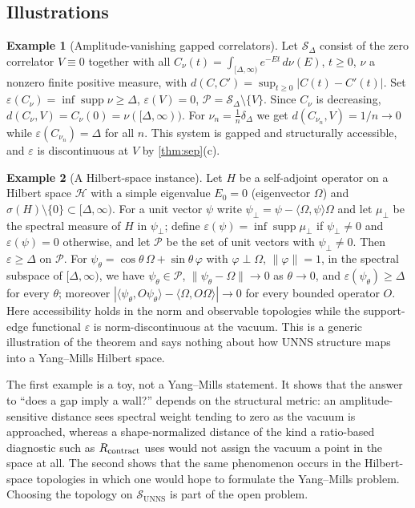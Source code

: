 \documentclass[11pt,a4paper]{article}
\theoremstyle{definition}
\newtheorem{example}{Example}
\theoremstyle{remark}
\newcommand{\SUNNS}{\mathcal{S}_{\mathrm{UNNS}}}
\newcommand{\Pset}{\mathcal{P}}
\newcommand{\uns}{UNNS}
\begin{document}
\subsection{Illustrations}
\begin{example}[Amplitude-vanishing gapped correlators]\label{ex:corr}
Let $\mathcal S_\Delta$ consist of the zero correlator $V\equiv0$ together with all $C_\nu(t)=\int_{[\Delta,\infty)}e^{-Et}\,d\nu(E)$, $t\ge0$, $\nu$ a nonzero finite positive measure, with $d(C,C')=\sup_{t\ge0}|C(t)-C'(t)|$. Set $\varepsilon(C_\nu)=\inf\operatorname{supp}\nu\ge\Delta$, $\varepsilon(V)=0$, $\Pset=\mathcal S_\Delta\setminus\{V\}$. Since $C_\nu$ is decreasing, $d(C_\nu,V)=C_\nu(0)=\nu([\Delta,\infty))$. For $\nu_n=\tfrac1n\delta_\Delta$ we get $d(C_{\nu_n},V)=1/n\to0$ while $\varepsilon(C_{\nu_n})=\Delta$ for all $n$. This system is gapped and structurally accessible, and $\varepsilon$ is discontinuous at $V$ by \cref{thm:sep}(c).
\end{example}
\begin{example}[A Hilbert-space instance]\label{ex:hilbert}
Let $H$ be a self-adjoint operator on a Hilbert space $\mathcal H$ with a simple eigenvalue $E_0=0$ (eigenvector $\Omega$) and $\sigma(H)\setminus\{0\}\subset[\Delta,\infty)$. For a unit vector $\psi$ write $\psi_\perp=\psi-\langle\Omega,\psi\rangle\Omega$ and let $\mu_\perp$ be the spectral measure of $H$ in $\psi_\perp$; define $\varepsilon(\psi)=\inf\operatorname{supp}\mu_\perp$ if $\psi_\perp\ne0$ and $\varepsilon(\psi)=0$ otherwise, and let $\Pset$ be the set of unit vectors with $\psi_\perp\ne0$. Then $\varepsilon\ge\Delta$ on $\Pset$. For $\psi_\theta=\cos\theta\,\Omega+\sin\theta\,\varphi$ with $\varphi\perp\Omega$, $\|\varphi\|=1$, in the spectral subspace of $[\Delta,\infty)$, we have $\psi_\theta\in\Pset$, $\|\psi_\theta-\Omega\|\to0$ as $\theta\to0$, and $\varepsilon(\psi_\theta)\ge\Delta$ for every $\theta$; moreover $|\langle\psi_\theta,O\psi_\theta\rangle-\langle\Omega,O\Omega\rangle|\to0$ for every bounded operator $O$. Here accessibility holds in the norm and observable topologies while the support-edge functional $\varepsilon$ is norm-discontinuous at the vacuum. This is a generic illustration of the theorem and says nothing about how \uns{} structure maps into a Yang--Mills Hilbert space.
\end{example}
The first example is a toy, not a Yang--Mills statement. It shows that the answer to ``does a gap imply a wall?'' depends on the structural metric: an amplitude-sensitive distance sees spectral weight tending to zero as the vacuum is approached, whereas a shape-normalized distance of the kind a ratio-based diagnostic such as $R_{\rm contract}$ uses would not assign the vacuum a point in the space at all. The second shows that the same phenomenon occurs in the Hilbert-space topologies in which one would hope to formulate the Yang--Mills problem. Choosing the topology on $\SUNNS$ is part of the open problem.
\end{document}
